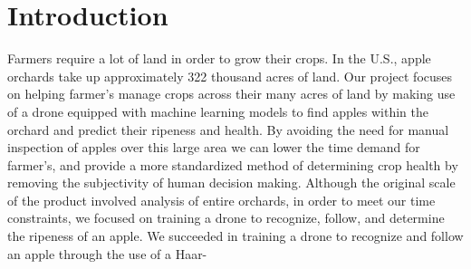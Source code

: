 \section{Introduction}
Farmers require a lot of land in order to grow their crops.  %
In the U.S., apple orchards take up approximately 322 thousand acres of land. %
Our project focuses on helping farmer's manage crops across their many acres of land by making use of a drone equipped with machine learning models to 
find apples within the orchard and predict their ripeness and health. By avoiding the need for manual inspection of apples over this large area 
we can lower the time demand for farmer's, and provide a more standardized method of determining crop health by removing the subjectivity of human decision making.
Although the original scale of the product involved analysis of entire orchards, in order to meet our time constraints, we focused on training a drone to recognize, follow, and determine the ripeness of an apple. We succeeded in training a drone to recognize and follow an apple through the use of a Haar-
\\
